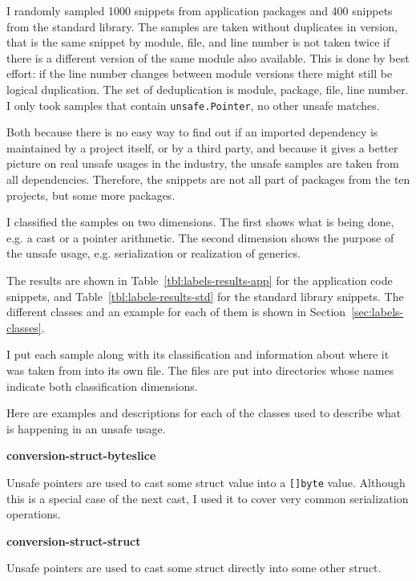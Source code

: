 I randomly sampled 1000 snippets from application packages and 400 snippets from the standard library.
The samples are taken without duplicates in version, that is the same snippet by module, file, and line number is not
taken twice if there is a different version of the same module also available.
This is done by best effort: if the line number changes between module versions there might still be logical
duplication.
The set of deduplication is module, package, file, line number.
I only took samples that contain \texttt{unsafe.Pointer}, no other unsafe matches.

Both because there is no easy way to find out if an imported dependency is maintained by a project itself, or by a
third party, and because it gives a better picture on real unsafe usages in the industry, the unsafe samples are taken
from all dependencies.
Therefore, the snippets are not all part of packages from the ten projects, but some more packages.

I classified the samples on two dimensions.
The first shows what is being done, e.g. a cast or a pointer arithmetic.
The second dimension shows the purpose of the unsafe usage, e.g. serialization or realization of generics.

The results are shown in Table~\ref{tbl:labels-results-app} for the application code snippets, and
Table~\ref{tbl:labels-results-std} for the standard library snippets.
The different classes and an example for each of them is shown in Section~\ref{sec:labels-classes}.



I put each sample along with its classification and information about where it was taken from into its own file.
The files are put into directories whose names indicate both classification dimensions.

Here are examples and descriptions for each of the classes used to describe what is happening in an unsafe usage.

\textbf{conversion-struct-byteslice}

Unsafe pointers are used to cast some struct value into a \texttt{[]byte} value.
Although this is a special case of the next cast, I used it to cover very common serialization operations.




\textbf{conversion-struct-struct}

Unsafe pointers are used to cast some struct directly into some other struct.

